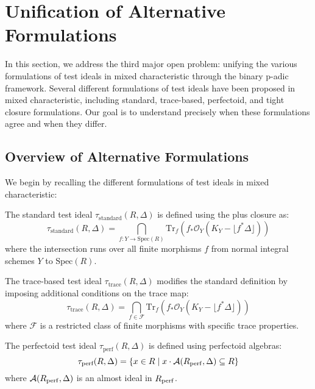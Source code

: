 \section{Unification of Alternative Formulations}\label{sec:alternative_formulations}

In this section, we address the third major open problem: unifying the various formulations of test ideals in mixed characteristic through the binary p-adic framework. Several different formulations of test ideals have been proposed in mixed characteristic, including standard, trace-based, perfectoid, and tight closure formulations. Our goal is to understand precisely when these formulations agree and when they differ.

\subsection{Overview of Alternative Formulations}

We begin by recalling the different formulations of test ideals in mixed characteristic:

\begin{definition}\label{def:standard-test-ideal}
The standard test ideal $\tau_{\text{standard}}(R,\Delta)$ is defined using the plus closure as:
$$\tau_{\text{standard}}(R,\Delta) = \bigcap_{f: Y \to \text{Spec}(R)} \text{Tr}_f(f_*\mathcal{O}_Y(K_Y - \lfloor f^*\Delta\rfloor))$$
where the intersection runs over all finite morphisms $f$ from normal integral schemes $Y$ to $\text{Spec}(R)$.
\end{definition}

\begin{definition}\label{def:trace-test-ideal}
The trace-based test ideal $\tau_{\text{trace}}(R,\Delta)$ modifies the standard definition by imposing additional conditions on the trace map:
$$\tau_{\text{trace}}(R,\Delta) = \bigcap_{f \in \mathcal{F}} \text{Tr}_f(f_*\mathcal{O}_Y(K_Y - \lfloor f^*\Delta\rfloor))$$
where $\mathcal{F}$ is a restricted class of finite morphisms with specific trace properties.
\end{definition}

\begin{definition}\label{def:perfectoid-test-ideal-expanded}
The perfectoid test ideal $\tau_{\text{perf}}(R,\Delta)$ is defined using perfectoid algebras:
$$\tau_{\text{perf}}(R,\Delta) = \{x \in R \mid x \cdot \mathcal{A}(R_{\operatorname{perf}}, \Delta) \subseteq R\}$$
where $\mathcal{A}(R_{\operatorname{perf}}, \Delta)$ is an almost ideal in $R_{\operatorname{perf}}$.
\end{definition}

